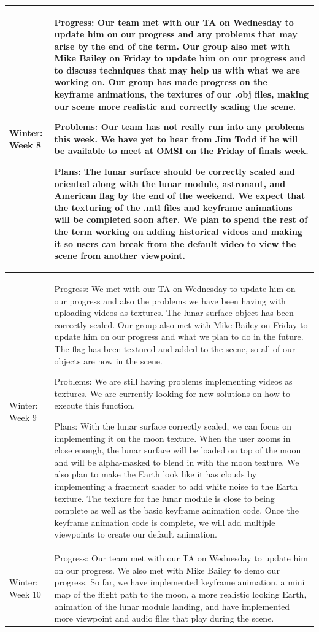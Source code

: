 \documentclass[onecolumn, draftclsnofoot,10pt, compsoc]{IEEEtran}
\begin{document}
\begin{longtable} {|p{1.5cm}|p{13.5cm}|}
Winter: Week 8 & 
Progress: Our team met with our TA on Wednesday to update him on our progress and any problems that may arise by the end of the term. Our group also met with Mike Bailey on Friday to update him on our progress and to discuss techniques that may help us with what we are working on. Our group has made progress on the keyframe animations, the textures of our .obj files, making our scene more realistic and correctly scaling the scene.

Problems: Our team has not really run into any problems this week. We have yet to hear from Jim Todd if he will be available to meet at OMSI on the Friday of finals week.

Plans: The lunar surface should be correctly scaled and oriented along with the lunar module, astronaut, and American flag by the end of the weekend. We expect that the texturing of the .mtl files and keyframe animations will be completed soon after. We plan to spend the rest of the term working on adding historical videos and making it so users can break from the default video to view the scene from another viewpoint.
\\ \hline

Winter: Week 9 & 
Progress: We met with our TA on Wednesday to update him on our progress and also the problems we have been having with uploading videos as textures. The lunar surface object has been correctly scaled. Our group also met with Mike Bailey on Friday to update him on our progress and what we plan to do in the future. The flag has been textured and added to the scene, so all of our objects are now in the scene.

Problems: We are still having problems implementing videos as textures. We are currently looking for new solutions on how to execute this function.

Plans: With the lunar surface correctly scaled, we can focus on implementing it on the moon texture. When the user zooms in close enough, the lunar surface will be loaded on top of the moon and will be alpha-masked to blend in with the moon texture. We also plan to make the Earth look like it has clouds by implementing a fragment shader to add white noise to the Earth texture. The texture for the lunar module is close to being complete as well as the basic keyframe animation code. Once the keyframe animation code is complete, we will add multiple viewpoints to create our default animation. 
\\ \hline

Winter: Week 10 & 
Progress: Our team met with our TA on Wednesday to update him on our progress. We also met with Mike Bailey to demo our progress. So far, we have implemented keyframe animation, a mini map of the flight path to the moon, a more realistic looking Earth, animation of the lunar module landing, and have implemented more viewpoint and audio files that play during the scene.


\end{longtable}
\end{document}
